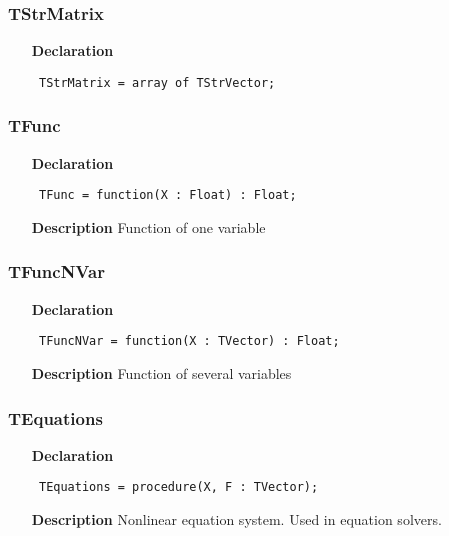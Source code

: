 \documentclass[12pt,a4paper,oneside]{report}
\newcommand{\declarationitem}[1]{\textbf{#1}}
\newcommand{\descriptiontitle}[1]{\textbf{#1}}
\newcommand{\code}[1]{\texttt{#1}}
\begin{document}
\subsubsection{TStrMatrix}
\label{utypes-TStrMatrix}
\begin{itemize}\item[\declarationitem{Declaration}\hfill]
	\begin{flushleft}
		\code{
			TStrMatrix  = array of TStrVector;}
		
	\end{flushleft}
	
\end{itemize}
\subsubsection{TFunc}
\label{utypes-TFunc}
\begin{itemize}\item[\declarationitem{Declaration}\hfill]
	\begin{flushleft}
		\code{
			TFunc = function(X : Float) : Float;}
		
	\end{flushleft}
	
	\par
	\item[\descriptiontitle{Description}]
	Function of one variable
	
\end{itemize}
\subsubsection{TFuncNVar}
\label{utypes-TFuncNVar}
\begin{itemize}\item[\declarationitem{Declaration}\hfill]
	\begin{flushleft}
		\code{
			TFuncNVar = function(X : TVector) : Float;}
		
	\end{flushleft}
	
	\par
	\item[\descriptiontitle{Description}]
	Function of several variables
	
\end{itemize}
\subsubsection{TEquations}
\label{utypes-TEquations}
\begin{itemize}\item[\declarationitem{Declaration}\hfill]
	\begin{flushleft}
		\code{
			TEquations = procedure(X, F : TVector);}
	\end{flushleft}
	\item[\descriptiontitle{Description}]
	Nonlinear equation system. Used in equation solvers.
\end{itemize}
\end{document}
